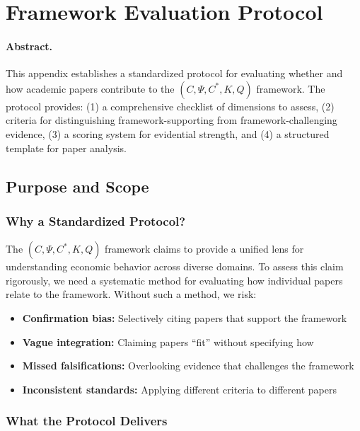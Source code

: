\section{Framework Evaluation Protocol}
\label{app:evaluationprotocol}

\paragraph{Abstract.}
This appendix establishes a standardized protocol for evaluating whether and
how academic papers contribute to the $(C, \Psi, C^*, K, Q)$ framework. The protocol 
provides: (1) a comprehensive checklist of dimensions to assess, (2) criteria
for distinguishing framework-supporting from framework-challenging evidence, (3)
a scoring system for evidential strength, and (4) a structured template for paper
analysis.

\subsection{Purpose and Scope}

\subsubsection{Why a Standardized Protocol?}

The $(C, \Psi, C^*, K, Q)$ framework claims to provide a unified lens for understanding 
economic behavior across diverse domains. To assess this claim rigorously, we need a 
systematic method for evaluating how individual papers relate to the framework. Without
such a method, we risk:

\begin{itemize}
  \item \textbf{Confirmation bias:} Selectively citing papers that support the framework
  \item \textbf{Vague integration:} Claiming papers ``fit'' without specifying how
  \item \textbf{Missed falsifications:} Overlooking evidence that challenges the framework
  \item \textbf{Inconsistent standards:} Applying different criteria to different papers
\end{itemize}

\subsubsection{What the Protocol Delivers}

